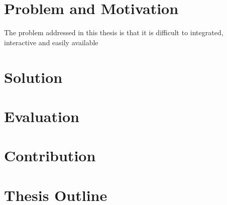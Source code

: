 






\section{Problem and Motivation}

The problem addressed in this thesis is that it is difficult to integrated, interactive and easily available

\section{Solution}


\section{Evaluation}

\section{Contribution}

\section{Thesis Outline}